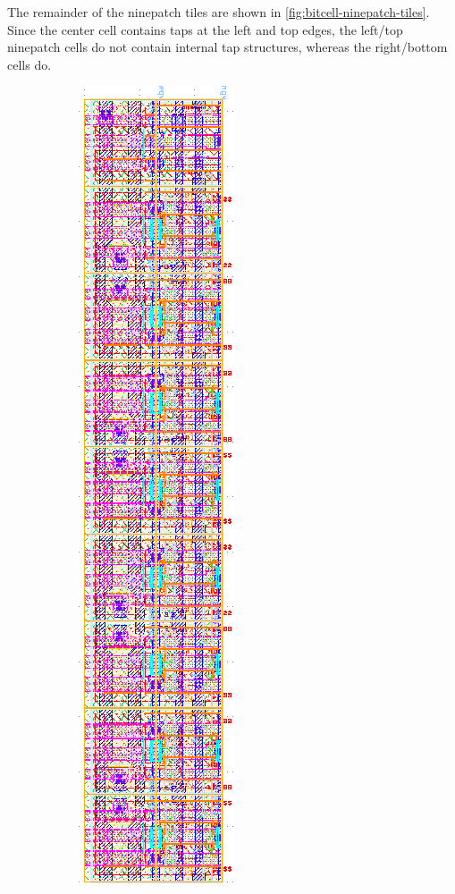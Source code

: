 The remainder of the ninepatch tiles are shown in \ref{fig:bitcell-ninepatch-tiles}.
Since the center cell contains taps at the left and top edges, the left/top ninepatch cells
do not contain internal tap structures, whereas the right/bottom cells do.
\begin{figure}[H] \centering
\begin{subfigure}[b]{0.22\textwidth} \centering
\includegraphics[width=\textwidth]{figures/bitcell_left.png}

\end{subfigure}
\end{figure}
